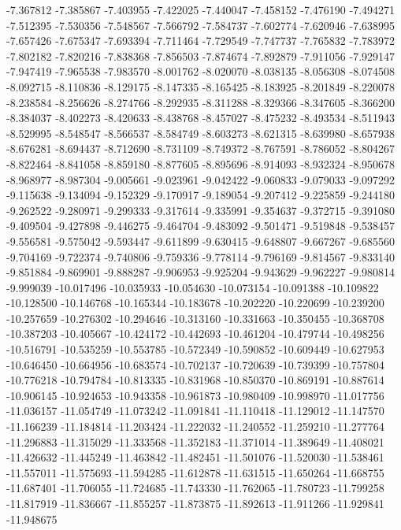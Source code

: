 -7.367812
-7.385867
-7.403955
-7.422025
-7.440047
-7.458152
-7.476190
-7.494271
-7.512395
-7.530356
-7.548567
-7.566792
-7.584737
-7.602774
-7.620946
-7.638995
-7.657426
-7.675347
-7.693394
-7.711464
-7.729549
-7.747737
-7.765832
-7.783972
-7.802182
-7.820216
-7.838368
-7.856503
-7.874674
-7.892879
-7.911056
-7.929147
-7.947419
-7.965538
-7.983570
-8.001762
-8.020070
-8.038135
-8.056308
-8.074508
-8.092715
-8.110836
-8.129175
-8.147335
-8.165425
-8.183925
-8.201849
-8.220078
-8.238584
-8.256626
-8.274766
-8.292935
-8.311288
-8.329366
-8.347605
-8.366200
-8.384037
-8.402273
-8.420633
-8.438768
-8.457027
-8.475232
-8.493534
-8.511943
-8.529995
-8.548547
-8.566537
-8.584749
-8.603273
-8.621315
-8.639980
-8.657938
-8.676281
-8.694437
-8.712690
-8.731109
-8.749372
-8.767591
-8.786052
-8.804267
-8.822464
-8.841058
-8.859180
-8.877605
-8.895696
-8.914093
-8.932324
-8.950678
-8.968977
-8.987304
-9.005661
-9.023961
-9.042422
-9.060833
-9.079033
-9.097292
-9.115638
-9.134094
-9.152329
-9.170917
-9.189054
-9.207412
-9.225859
-9.244180
-9.262522
-9.280971
-9.299333
-9.317614
-9.335991
-9.354637
-9.372715
-9.391080
-9.409504
-9.427898
-9.446275
-9.464704
-9.483092
-9.501471
-9.519848
-9.538457
-9.556581
-9.575042
-9.593447
-9.611899
-9.630415
-9.648807
-9.667267
-9.685560
-9.704169
-9.722374
-9.740806
-9.759336
-9.778114
-9.796169
-9.814567
-9.833140
-9.851884
-9.869901
-9.888287
-9.906953
-9.925204
-9.943629
-9.962227
-9.980814
-9.999039
-10.017496
-10.035933
-10.054630
-10.073154
-10.091388
-10.109822
-10.128500
-10.146768
-10.165344
-10.183678
-10.202220
-10.220699
-10.239200
-10.257659
-10.276302
-10.294646
-10.313160
-10.331663
-10.350455
-10.368708
-10.387203
-10.405667
-10.424172
-10.442693
-10.461204
-10.479744
-10.498256
-10.516791
-10.535259
-10.553785
-10.572349
-10.590852
-10.609449
-10.627953
-10.646450
-10.664956
-10.683574
-10.702137
-10.720639
-10.739399
-10.757804
-10.776218
-10.794784
-10.813335
-10.831968
-10.850370
-10.869191
-10.887614
-10.906145
-10.924653
-10.943358
-10.961873
-10.980409
-10.998970
-11.017756
-11.036157
-11.054749
-11.073242
-11.091841
-11.110418
-11.129012
-11.147570
-11.166239
-11.184814
-11.203424
-11.222032
-11.240552
-11.259210
-11.277764
-11.296883
-11.315029
-11.333568
-11.352183
-11.371014
-11.389649
-11.408021
-11.426632
-11.445249
-11.463842
-11.482451
-11.501076
-11.520030
-11.538461
-11.557011
-11.575693
-11.594285
-11.612878
-11.631515
-11.650264
-11.668755
-11.687401
-11.706055
-11.724685
-11.743330
-11.762065
-11.780723
-11.799258
-11.817919
-11.836667
-11.855257
-11.873875
-11.892613
-11.911266
-11.929841
-11.948675
